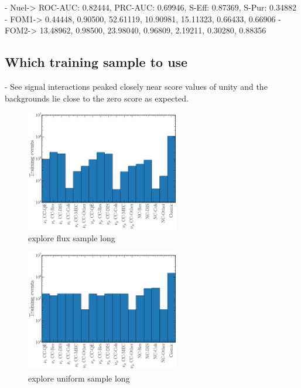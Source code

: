 - Nuel-> ROC-AUC: 0.82444, PRC-AUC: 0.69946, S-Eff: 0.87369, S-Pur: 0.34882
- FOM1-> 0.44448, 0.90500, 52.61119, 10.90981, 15.11323, 0.66433, 0.66906
- FOM2-> 13.48962, 0.98500, 23.98040, 0.96809, 2.19211, 0.30280, 0.88356

\subsection{Which training sample to use} %
\label{sec:cvn_baseline_sample} %

- See signal interactions peaked closely near score values of unity and the backgrounds lie close
to the zero score as expected.

\begin{figure} %
    \includegraphics[width=0.6\textwidth]{diagrams/6-cvn/chipsnet/explore_flux_sample.pdf}
    \caption[explore flux sample short]
    {explore flux sample long}
    \label{fig:explore_flux_sample}
\end{figure}

\begin{figure} %
    \includegraphics[width=0.6\textwidth]{diagrams/6-cvn/chipsnet/explore_uniform_sample.pdf}
    \caption[explore uniform sample short]
    {explore uniform sample long}
    \label{fig:explore_uniform_sample}
\end{figure}

